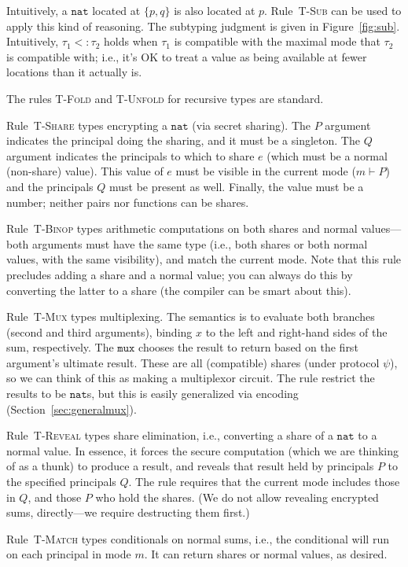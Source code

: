\documentclass[10pt]{article}
\newcommand{\rulelab}[1]{{\small \textsc{#1}}}
\newcommand{\kw}[1]{\ensuremath{\mathtt{#1}}}
\newcommand{\tnat}{\ensuremath{\mathtt{nat}}}
\newcommand{\subtype}{\ensuremath{<:}}
\newcommand{\issub}[2]{{#1} \subtype {#2}}
\begin{document}
Intuitively, a $\tnat$ located at $\{p,q\}$ is also located at
$p$. Rule~\rulelab{T-Sub} can be used to apply this kind of
reasoning. The subtyping judgment is given in
Figure~\ref{fig:sub}. Intuitively, $\issub{\tau_1}{\tau_2}$ holds when
$\tau_1$ is compatible with the maximal mode that $\tau_2$ is
compatible with; i.e., it's OK to treat a value as being available at
fewer locations than it actually is.

The rules \rulelab{T-Fold} and \rulelab{T-Unfold} for recursive types
are standard.

Rule~\rulelab{T-Share} types encrypting a $\tnat$ (via secret
sharing). The $P$ argument indicates the principal doing the sharing,
and it must be a singleton. The $Q$ argument indicates the principals
to which to share $e$ (which must be a normal (non-share) value). This
value of $e$ must be visible in the current mode ($m \vdash P$) and
the principals $Q$ must be present as well. Finally, the value must be
a number; neither pairs nor functions can be shares.

Rule~\rulelab{T-Binop} types arithmetic computations on both shares
and normal values---both arguments must have the same type (i.e., both
shares or both normal values, with the same visibility), and match the
current mode. Note that this rule precludes adding a 
share and a normal value; you can always do this by converting the
latter to a share (the compiler can be smart about this).

Rule~\rulelab{T-Mux} types multiplexing. The semantics is to evaluate
both branches (second and third arguments), binding $x$ to the left
and right-hand sides of the sum, respectively. The $\kw{mux}$ chooses
the result to return based on the first argument's ultimate
result. These are all (compatible) shares (under protocol $\psi$), so
we can think of this as making a multiplexor circuit. The rule
restrict the results to be $\tnat$s, but this is easily generalized
via encoding (Section~\ref{sec:generalmux}).

Rule~\rulelab{T-Reveal} types share elimination, i.e., converting a
share of a $\tnat$ to a normal value. In essence, it forces the secure
computation (which we are thinking of as a thunk) to produce a result,
and reveals that result held by principals $P$ to the specified
principals $Q$. The rule requires that the current mode includes those
in $Q$, and those $P$ who hold the shares. (We do not allow revealing
encrypted sums, directly---we require destructing them first.)

Rule~\rulelab{T-Match} types conditionals on normal sums, i.e., the
conditional will run on each principal in mode $m$. It can return
shares or normal values, as desired. 
\end{document}
